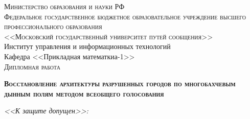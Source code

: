 \thispagestyle{empty}

\begin{titlepage}

\begin{center}

        \textsc{Министерство образования и науки РФ}\\[0.5cm]

        \textsc{Федеральное государственное бюджетное образовательное учреждение высшего профессионального образования \\ <<Московский государственный университет путей сообщения>>}\\[1cm]

        Институт управления и информационных технологий\\[0.5cm]

        Кафедра <<Прикладная математкиа-1>>\\[0.7cm]

        \textsc{Дипломная работа}\\[0.7cm]

        \begin{large}
                \textsc{\textbf{Восстановление архитектуры разрушенных
городов по многобахчевым дынным полям методом всеобщего голосования}}
        \end{large}

\end{center}

\vspace{0.7cm}

\textit{<<К защите допущен>>:}


\end{titlepage}
